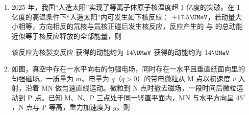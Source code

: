 \documentclass[\gkver]{gaokaozhenti}
\begin{document}
\begin{enumerate}
{得 C 错误；

D．做匀速圆周运动的物体，其合外力等于向心力，故合力总是指向圆心 O，D 正确。

故选 AD。
}

\item
2025 年，我国“人造太阳”实现了等离子体原子核温度超 1 亿度的突破。在 1 亿度的高温条件下“人造太阳”内可发生如下核反应： $+ 17.5 \UMeV$，若动量大小相等，方向相反的氘核与氚核正碰后发生核反应，反应产生的  与  的总动能近似等于核反应释放的全部能量，则

{该反应为核裂变反应}
{ 获得的动能约为 $14 \UMeV$}
{ 获得的动能约为 $14 \UMeV$}


\item
如图，真空中存在一水平向右的匀强电场，同时存在一水平且垂直纸面向里的匀强磁场。一质量为 $m$、电量为 $q$（$q > 0$）的带电微粒从 M 点以初速度 $v$ 入射，沿着 MN 做匀速直线运动。微粒到 N 点时撤去磁场，一段时间后微粒运动到 P 点。已知 M、N、P 三点处于同一竖直平面内，MN 与水平方向呈 $45^\circ$，N 点与 P 等高，重力加速度为 $g$，则



\end{enumerate}
\end{document}
